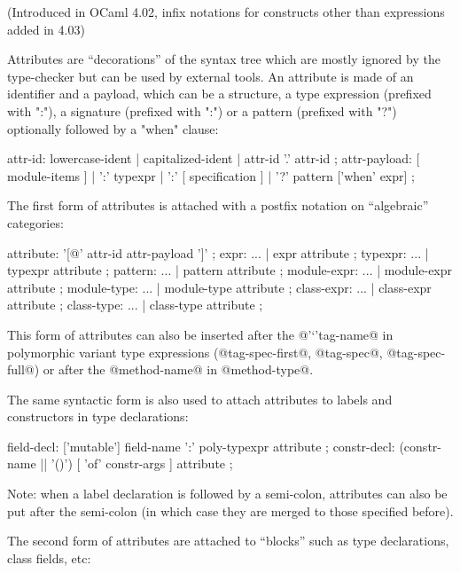 
(Introduced in OCaml 4.02,
infix notations for constructs other than expressions added in 4.03)

Attributes are ``decorations'' of the syntax tree which are mostly
ignored by the type-checker but can be used by external tools.  An
attribute is made of an identifier and a payload, which can be a
structure, a type expression (prefixed with ":"), a signature
(prefixed with ":") or a pattern (prefixed with "?") optionally
followed by a "when" clause:


\begin{syntax}
attr-id:
    lowercase-ident
 |  capitalized-ident
 |  attr-id '.' attr-id
;
attr-payload:
    [ module-items ]
 |  ':' typexpr
 |  ':' [ specification ]
 |  '?' pattern ['when' expr]
;
\end{syntax}

The first form of attributes is attached with a postfix notation on
``algebraic'' categories:

\begin{syntax}
attribute:
    '[@' attr-id attr-payload ']'
;
expr: ...
     | expr attribute
;
typexpr: ...
     | typexpr attribute
;
pattern: ...
     | pattern attribute
;
module-expr: ...
     | module-expr attribute
;
module-type: ...
     | module-type attribute
;
class-expr: ...
     | class-expr attribute
;
class-type: ...
     | class-type attribute
;
\end{syntax}

This form of attributes can also be inserted after the @'`'tag-name@
in polymorphic variant type expressions (@tag-spec-first@, @tag-spec@,
@tag-spec-full@) or after the @method-name@ in @method-type@.

The same syntactic form is also used to attach attributes to labels and
constructors in type declarations:

\begin{syntax}
field-decl:
          ['mutable'] field-name ':' poly-typexpr {attribute}
;
constr-decl:
          (constr-name || '()') [ 'of' constr-args ] {attribute}
;
\end{syntax}

Note: when a label declaration is followed by a semi-colon, attributes
can also be put after the semi-colon (in which case they are merged to
those specified before).


The second form of attributes are attached to ``blocks'' such as type
declarations, class fields, etc:

